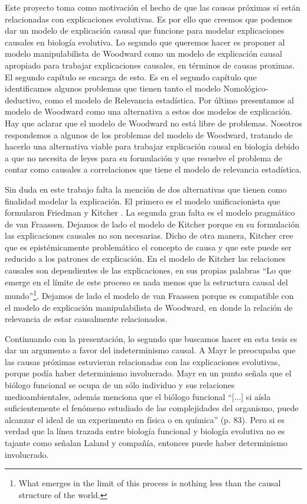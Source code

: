 Este proyecto toma como motivación el hecho de que las causas próximas sí están relacionadas con explicaciones evolutivas. Es por ello que creemos que podemos dar un modelo de explicación causal que funcione para modelar explicaciones causales en biología evolutiva. Lo segundo que queremos hacer es proponer al modelo manipulabilista de Woodward  \cite{Woodward2000, Woodward2003} como un modelo de explicación causal apropiado para trabajar explicaciones causales, en términos de causas proximas. El segundo capítulo se encarga de esto. Es en el segundo capítulo que identificamos algunos problemas que tienen tanto el modelo Nomológico-deductivo, como el modelo de Relevancia estadística. Por último presentamos al modelo de Woodward como una alternativa a estos dos modelos de explicación. Hay que aclarar que el modelo de Woodward no está libre de problemas. Nosotros respondemos a algunos de los problemas del modelo de Woodward, tratando de hacerlo una alternativa viable para trabajar explicación causal en biología debido a que no necesita de leyes para su formulación y que resuelve el problema de contar como causales a correlaciones que tiene el modelo de relevancia estadística.

Sin duda en este trabajo falta la mención de dos alternativas que tienen como finalidad modelar la explicación. El primero es el modelo unificacionista que formularon Friedman \citeyear{Friedman1974} y Kitcher \cite{Kitcher2002}. La segunda gran falta es el modelo pragmático de van Fraassen. Dejamos de lado el modelo de Kitcher porque en su formulación las explicaciones causales no son necesarias. Dicho de otra manera, Kitcher cree que es epistémicamente problemático el concepto de causa y que este puede ser reducido a los patrones de explicación. En el modelo de Kitcher las relaciones causales son dependientes de las explicaciones, en sus propias palabras ``Lo que emerge en el límite de este proceso es nada menos que la estructura causal del mundo''\footnote{What emerges in the limit of this process is nothing less than the causal structure of the world.}. Dejamos de lado el modelo de van Fraassen porque es compatible con el modelo de explicación manipulabilista de Woodward, en donde la relación de relevancia de estar causalmente relacionados.

Continuando con la presentación, lo segundo que buscamos hacer en esta tesis es dar un argumento a favor del indeterminismo causal. A Mayr le preocupaba que las causas próximas estuvieran relacionadas con las explicaciones evolutivas, porque podía haber determinismo involucrado. Mayr \cite{Mayr1998} en un punto señala que el biólogo funcional se ocupa de un sólo individuo y sus relaciones medioambientales, además menciona que el biólogo funcional ``[...] si aísla suficientemente el fenómeno estudiado de las complejidades del organismo, puede alcanzar el ideal de un experimento en física o en química'' (p. 83). Pero si es verdad que la línea trazada entre biología funcional y biología evolutiva no es tajante como señalan Laland y compañía, entonces puede haber determinismo involucrado.


